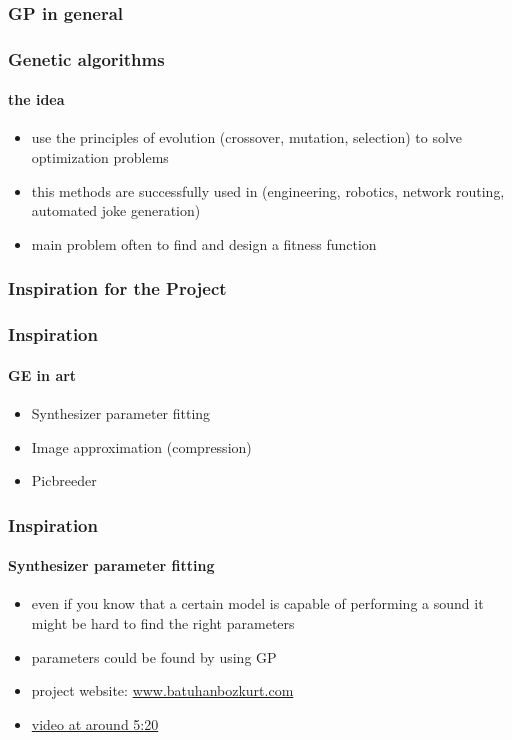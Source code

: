 \documentclass{beamer}
\begin{document}
\subsubsection{GP in general} %
\label{sg:ssub:gp_in_general}

\begin{frame}
	\frametitle{Genetic algorithms}
	\framesubtitle{the idea}
	
	\begin{itemize}
		\item<1-> use the principles of evolution (crossover, mutation, selection)
		to solve optimization problems
		\item<2-> this methods are successfully used in (engineering, robotics, network routing,
		automated joke generation) 
		\item<3-> main problem often to find and design a fitness function
	\end{itemize}
\end{frame}


\subsubsection{Inspiration for the Project} %
\label{sg:ssub:inspiration_for_the_project}

\begin{frame}
	\frametitle{Inspiration}
	\framesubtitle{GE in art}
	
	\begin{itemize}
		\item<1-> Synthesizer parameter fitting
		\item<2-> Image approximation (compression)
		\item<3-> Picbreeder
	\end{itemize}
\end{frame}

\begin{frame}
	\frametitle{Inspiration}
	\framesubtitle{Synthesizer parameter fitting}

	\begin{itemize}
		\item<1-> even if you know that a certain model is capable of performing a sound
		it might be hard to find the right parameters
		\item<2-> parameters could be found by using GP
		\item<3-> project website: \href{http://www.batuhanbozkurt.com/news/naturetoolkit-update-genetic-algorithms-and-parameter-estimation-for-supercollider}{www.batuhanbozkurt.com}
		\item<4-> \href{http://vimeo.com/7908757}{video at around 5:20}
	\end{itemize}
\end{frame}
\end{document}
